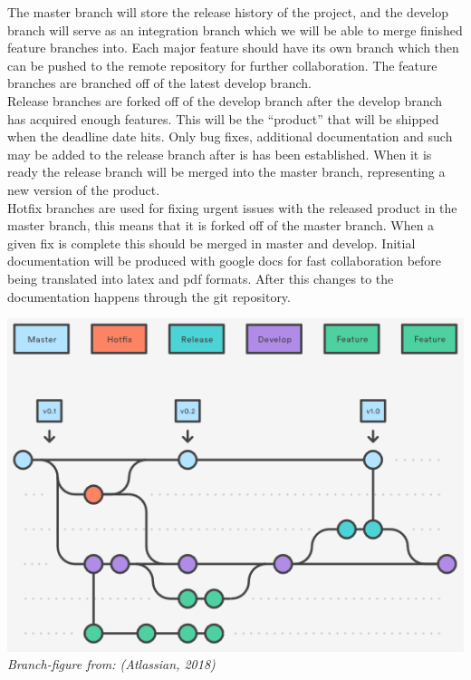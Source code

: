 \documentclass[12pt]{article}%
\begin{document}
The master branch will store the release history of the project, and the develop 		branch will serve as an integration branch which we will be able to merge finished 	feature branches into. Each major feature should have its own branch which then can be pushed to the remote repository for further collaboration. The feature branches are branched off of the latest develop branch. \\
Release branches are forked off of the develop branch after the develop branch has acquired enough features. This will be the “product” that will be shipped when the deadline date hits. Only bug fixes, additional documentation and such may be added to the release branch after is has been established. When it is ready the release branch will be merged into the master branch, representing a new version of the product. \\
Hotfix branches are used for fixing urgent issues with the released product in the master branch, this means that it is forked off of the master branch. When a given fix is complete this should be merged in master and develop.
Initial documentation will be produced with google docs for fast collaboration before being translated into latex and pdf formats. After this changes to the documentation happens through the git repository. \\

\begin{center}
\includegraphics[scale=0.8]{image12.png}\\
\textit{Branch-figure from: (Atlassian, 2018)}
\end{center}
\vspace{5mm}
\end{document}

